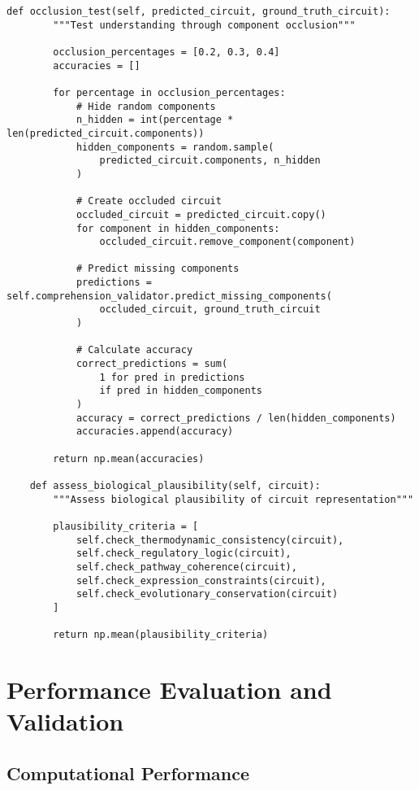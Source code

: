 \documentclass[12pt,a4paper]{article}
\begin{document}
\begin{lstlisting}[style=pythonstyle, caption=Visual Understanding Verification Implementation]
    def occlusion_test(self, predicted_circuit, ground_truth_circuit):
        """Test understanding through component occlusion"""
        
        occlusion_percentages = [0.2, 0.3, 0.4]
        accuracies = []
        
        for percentage in occlusion_percentages:
            # Hide random components
            n_hidden = int(percentage * len(predicted_circuit.components))
            hidden_components = random.sample(
                predicted_circuit.components, n_hidden
            )
            
            # Create occluded circuit
            occluded_circuit = predicted_circuit.copy()
            for component in hidden_components:
                occluded_circuit.remove_component(component)
            
            # Predict missing components
            predictions = self.comprehension_validator.predict_missing_components(
                occluded_circuit, ground_truth_circuit
            )
            
            # Calculate accuracy
            correct_predictions = sum(
                1 for pred in predictions 
                if pred in hidden_components
            )
            accuracy = correct_predictions / len(hidden_components)
            accuracies.append(accuracy)
        
        return np.mean(accuracies)
        
    def assess_biological_plausibility(self, circuit):
        """Assess biological plausibility of circuit representation"""
        
        plausibility_criteria = [
            self.check_thermodynamic_consistency(circuit),
            self.check_regulatory_logic(circuit),
            self.check_pathway_coherence(circuit),
            self.check_expression_constraints(circuit),
            self.check_evolutionary_conservation(circuit)
        ]
        
        return np.mean(plausibility_criteria)
\end{lstlisting}

\section{Performance Evaluation and Validation}

\subsection{Computational Performance}
\end{document}
